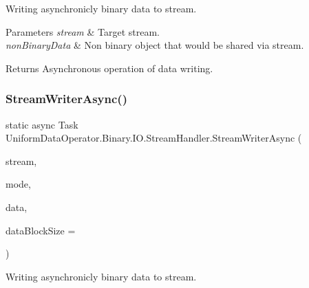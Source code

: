 Writing asynchronicly binary data to stream. 


\begin{DoxyParams}{Parameters}
{\em stream} & Target stream.\\
\hline
{\em non\+Binary\+Data} & Non binary object that would be shared via stream.\\
\hline
\end{DoxyParams}
\begin{DoxyReturn}{Returns}
Asynchronous operation of data writing.
\end{DoxyReturn}
\mbox{\label{class_uniform_data_operator_1_1_binary_1_1_i_o_1_1_stream_handler_a0fc1ed2097c0b9582d4abb366cee82b2}} 
\subsubsection{\texorpdfstring{Stream\+Writer\+Async()}{StreamWriterAsync()}\hspace{0.1cm}{\footnotesize\ttfamily [3/4]}}
{\footnotesize\ttfamily static async Task Uniform\+Data\+Operator.\+Binary.\+I\+O.\+Stream\+Handler.\+Stream\+Writer\+Async (\begin{DoxyParamCaption}\item[{Stream}]{stream,  }\item[{\mbox{\hyperlink{namespace_uniform_data_operator_1_1_binary_1_1_i_o_a3fee9a9bcba25974554ed63395942161}{Stream\+Chanel\+Mode}}}]{mode,  }\item[{byte \mbox{[}$\,$\mbox{]}}]{data,  }\item[{int}]{data\+Block\+Size = {} }\end{DoxyParamCaption})\hspace{0.3cm}{\ttfamily [static]}}



Writing asynchronicly binary data to stream. 


